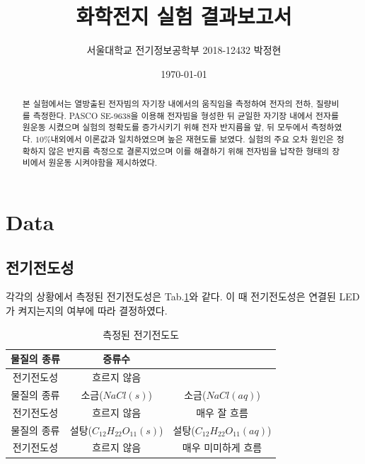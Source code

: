 \documentclass[%
 reprint,
 amsmath,amssymb,
 aps,
]{revtex4-2}
\begin{document}
\title{화학전지 실험 결과보고서}

\author{서울대학교 전기정보공학부 2018-12432 박정현}
\date{\today}%

\begin{abstract}
본 실험에서는 열방출된 전자빔의 자기장 내에서의 움직임을 측정하여 전자의 전하, 질량비를 측정한다. PASCO SE-9638을 이용해 전자빔을 형성한 뒤 균일한 자기장 내에서 전자를 원운동 시켰으며 실험의 정확도를 증가시키기 위해 전자 반지름을 앞, 뒤 모두에서 측정하였다. $10\%$내외에서 이론값과 일치하였으며 높은 재현도를 보였다. 실험의 주요 오차 원인은 정확하지 않은 반지름 측정으로 결론지었으며 이를 해결하기 위해 전자빔을 납작한 형태의 장비에서 원운동 시켜야함을 제시하였다.
\end{abstract}

\maketitle


\section{\label{sec:level1}Data}
\subsection{\label{sec:level2}전기전도성}
각각의 상황에서 측정된 전기전도성은 Tab.\ref{tab:elecond}와 같다. 이 때 전기전도성은 연결된 LED가 켜지는지의 여부에 따라 결정하였다.
\begin{table}[]
\begin{tabular}{c|c|c} \hline \hline
 물질의 종류 & 증류수 \\ \hline
전기전도성 & 흐르지 않음\\ \hline \hline
 물질의 종류 & 소금($NaCl(s)$) & 소금($NaCl(aq)$) \\ \hline
전기전도성 & 흐르지 않음 & 매우 잘 흐름 \\ \hline \hline
 물질의 종류 & 설탕($C_{12}H_{22}O_{11}(s)$) & 설탕($C_{12}H_{22}O_{11}(aq)$)\\ \hline
전기전도성 & 흐르지 않음 & 매우 미미하게 흐름 \\ \hline \hline 
\end{tabular}
\caption{\label{tab:elecond}측정된 전기전도도}
\end{table}
\end{document}
